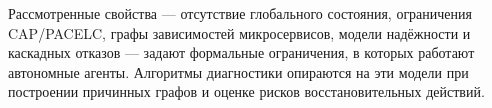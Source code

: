 \medskip

Рассмотренные свойства --- отсутствие глобального состояния, ограничения CAP/PACELC, графы зависимостей микросервисов, модели надёжности и каскадных отказов --- задают формальные ограничения, в которых работают автономные агенты. Алгоритмы диагностики опираются на эти модели при построении причинных графов и оценке рисков восстановительных действий.
